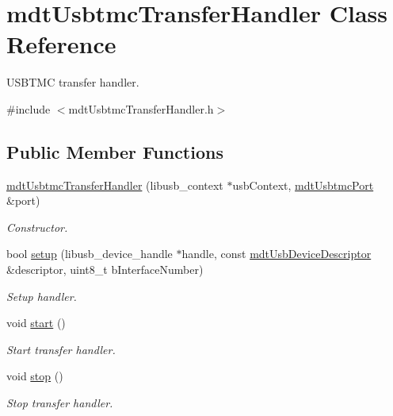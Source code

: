 \hypertarget{classmdt_usbtmc_transfer_handler}{\section{mdt\-Usbtmc\-Transfer\-Handler Class Reference}
\label{classmdt_usbtmc_transfer_handler}
}


U\-S\-B\-T\-M\-C transfer handler.  




{\ttfamily \#include $<$mdt\-Usbtmc\-Transfer\-Handler.\-h$>$}

\subsection*{Public Member Functions}
\begin{DoxyCompactItemize}
\item 
\hyperlink{classmdt_usbtmc_transfer_handler_af40f6740a823a75628890eb04466e2b8}{mdt\-Usbtmc\-Transfer\-Handler} (libusb\-\_\-context $\ast$usb\-Context, \hyperlink{classmdt_usbtmc_port}{mdt\-Usbtmc\-Port} \&port)
\begin{DoxyCompactList}\small\item\em Constructor. \end{DoxyCompactList}\item 
bool \hyperlink{classmdt_usbtmc_transfer_handler_a6771b010d3d050c7edae058996eb5a8d}{setup} (libusb\-\_\-device\-\_\-handle $\ast$handle, const \hyperlink{classmdt_usb_device_descriptor}{mdt\-Usb\-Device\-Descriptor} \&descriptor, uint8\-\_\-t b\-Interface\-Number)
\begin{DoxyCompactList}\small\item\em Setup handler. \end{DoxyCompactList}\item 
void \hyperlink{classmdt_usbtmc_transfer_handler_aa42e173d97b63438ab7e593909ee7d2b}{start} ()
\begin{DoxyCompactList}\small\item\em Start transfer handler. \end{DoxyCompactList}\item 
void \hyperlink{classmdt_usbtmc_transfer_handler_afa26a3493a8c66db38d20a7192b8ff68}{stop} ()
\begin{DoxyCompactList}\small\item\em Stop transfer handler. \end{DoxyCompactList}\item 

\end{DoxyCompactItemize}

